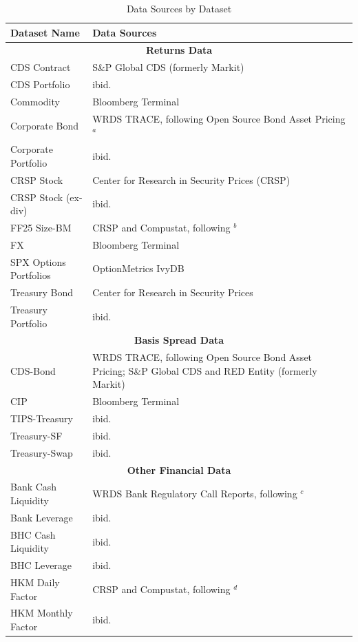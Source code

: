\documentclass{article}
\begin{document}
\begin{table}[htbp]
\centering
\caption{Data Sources by Dataset}
\label{tab:data_sources}
\footnotesize
\begin{threeparttable}
\begin{tabular}{p{4cm}p{8cm}}
\toprule
Dataset Name & Data Sources \\ 
\midrule
\multicolumn{2}{c}{\textbf{Returns Data}} \\
\midrule
CDS Contract & S\&P Global CDS (formerly Markit)  \\
CDS Portfolio & ibid. \\
Commodity & Bloomberg Terminal \\
Corporate Bond & WRDS TRACE, following Open Source Bond Asset Pricing$^{a}$  \\
Corporate Portfolio & ibid. \\
CRSP Stock & Center for Research in Security Prices (CRSP) \\
CRSP Stock (ex-div) & ibid. \\
FF25 Size-BM & CRSP and Compustat, following \citet{Fama2023}$^{b}$ \\
FX & Bloomberg Terminal \\
SPX Options Portfolios & OptionMetrics IvyDB\\
Treasury Bond & Center for Research in Security Prices \\
Treasury Portfolio & ibid. \\
\midrule
\multicolumn{2}{c}{\textbf{Basis Spread Data}} \\
\midrule
CDS-Bond & WRDS TRACE, following Open Source Bond Asset Pricing; S\&P Global CDS and RED Entity (formerly Markit) \\
CIP & Bloomberg Terminal \\
TIPS-Treasury & ibid. \\
Treasury-SF & ibid. \\
Treasury-Swap & ibid. \\
\midrule
\multicolumn{2}{c}{\textbf{Other Financial Data}} \\
\midrule
Bank Cash Liquidity & WRDS Bank Regulatory Call Reports, following \citet{Drechsler2017}$^{c}$ \\
Bank Leverage & ibid. \\
BHC Cash Liquidity & ibid. \\
BHC Leverage & ibid. \\
HKM Daily Factor & CRSP and Compustat, following \citet{He2017}$^{d}$\\
HKM Monthly Factor & ibid. \\

\end{tabular}
\end{threeparttable}
\end{table}
\end{document}
